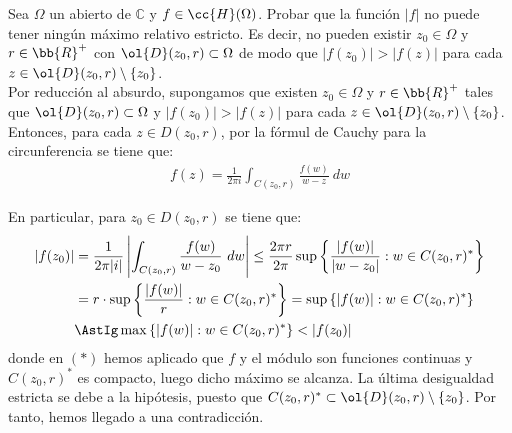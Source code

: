 \documentclass[12pt]{article}
\begin{document}
    \begin{ejercicio}[3 puntos]
        Sea $\Omega$ un abierto de $\mathbb{C}$ y $f \in \cc{H} (\Omega)$. Probar que la función $|f|$ no puede tener ningún máximo relativo estricto. Es decir, no pueden existir $z_0 \in \Omega$ y $r\in \bb{R}^+$ con $\ol{D}(z_0 , r) \subset \Omega$ de modo que $|f(z_0 )| > |f(z)|$ para cada $z \in \ol{D}(z_0 , r) \setminus \{z_0\}$.\\


        Por reducción al absurdo, supongamos que existen $z_0 \in \Omega$ y $r\in \bb{R}^+$ tales que $\ol{D}(z_0 , r) \subset \Omega$ y $|f(z_0 )| > |f(z)|$ para cada $z \in \ol{D}(z_0 , r) \setminus \{z_0\}$.\\

        Entonces, para cada $z\in D(z_0 , r)$, por la fórmul de Cauchy para la circunferencia se tiene que:
        \begin{align*}
            f(z) = \frac{1}{2\pi i} \int_{C(z_0 , r)} \frac{f(w)}{w - z}\ dw
        \end{align*}

        En particular, para $z_0\in D(z_0 , r)$ se tiene que:
        \begin{align*}
            |f(z_0)| &= \frac{1}{2\pi |i|} \left|\int_{C(z_0 , r)} \frac{f(w)}{w - z_0}\ dw\right| \leq \frac{2\pi r}{2\pi} \sup\left\{\dfrac{|f(w)|}{|w - z_0|} : w \in C(z_0 , r)^*\right\} \\
            &= r\cdot \sup\left\{\dfrac{|f(w)|}{r} : w \in C(z_0 , r)^*\right\} = \sup\left\{|f(w)| : w \in C(z_0 , r)^*\right\}
            \\ &\AstIg \max \left\{|f(w)| : w \in C(z_0 , r)^*\right\} < |f(z_0)|
        \end{align*}
        donde en $(\ast)$ hemos aplicado que $f$ y el módulo son funciones continuas y $C(z_0 , r)^*$ es compacto, luego dicho máximo se alcanza. La última desigualdad estricta se debe a la hipótesis, puesto que $C(z_0 , r)^*\subset \ol{D}(z_0 , r) \setminus \{z_0\}$. Por tanto, hemos llegado a una contradicción.
    \end{ejercicio}
\end{document}
